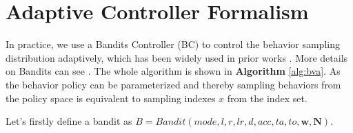 \clearpage

\section{Adaptive Controller Formalism}
\label{Sec: appendix MAB}

In practice, we use a Bandits Controller (BC) to control the behavior sampling distribution adaptively, which has been widely used in prior works \citep{agent57,casa_entropy}. More details on Bandits  can see \citep{sutton}. The whole algorithm is shown in \textbf{Algorithm} \ref{alg:bva}. As the behavior policy can be parameterized and thereby sampling behaviors from the policy space is equivalent to sampling indexes $x$ from the index set. 

Let's firstly define a bandit as $B = Bandit(mode, l, r, lr, d, acc, ta, to, \textbf{w}, \textbf{N})$.
